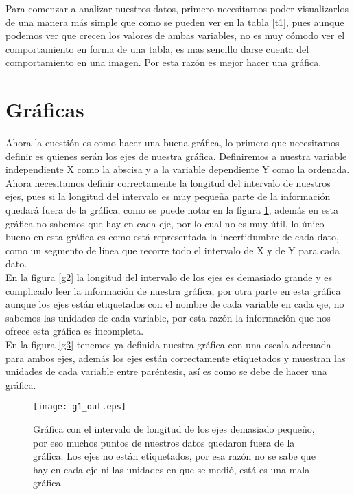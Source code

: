 \documentclass[12pt,letterpaper]{report}
\begin{document}
Para comenzar a analizar nuestros datos, primero necesitamos poder visualizarlos de una manera más simple que como se pueden ver en la tabla \ref{t1}, pues aunque podemos ver que crecen los valores de ambas variables, no es muy cómodo ver el comportamiento en forma de una tabla, es mas sencillo darse cuenta del comportamiento en una imagen. Por esta razón es mejor hacer una gráfica.\\

\section{Gráficas}

Ahora la cuestión es como hacer una buena gráfica, lo primero que necesitamos definir es quienes serán los ejes de nuestra gráfica. Definiremos a nuestra variable independiente X como la abscisa y a la variable dependiente  Y como la ordenada. Ahora necesitamos definir correctamente  la longitud del intervalo de nuestros ejes, pues si la longitud del intervalo es muy pequeña parte de la información quedará fuera de la gráfica, como se puede notar en la figura \ref{g1}, además en esta gráfica no sabemos que hay en cada eje, por lo cual no es muy útil, lo único bueno en esta gráfica es como está representada la incertidumbre de cada dato, como un segmento de línea que recorre todo el intervalo de X y de Y para cada dato.\\

En la  figura \ref{g2} la longitud del intervalo de los ejes es demasiado grande y  es complicado leer la información de nuestra gráfica, por otra parte en esta gráfica aunque los ejes están etiquetados con el nombre de cada variable en cada eje, no sabemos las unidades de cada variable, por esta razón la información que nos ofrece esta gráfica es incompleta.\\ 

En la figura \ref{g3} tenemos ya definida nuestra gráfica con una escala adecuada para ambos ejes, además los ejes están correctamente etiquetados y muestran las unidades de cada variable entre paréntesis, así es como se debe de hacer una gráfica.\\

\begin{figure}
\begin{center}
\texttt{[image: g1\_out.eps]} 
\caption{Gráfica con el intervalo de longitud de los ejes demasiado pequeño, por eso muchos puntos de nuestros datos quedaron fuera de la gráfica. Los ejes no están  etiquetados, por esa razón no se sabe que hay en cada eje ni las unidades en que se medió, está es una mala gráfica.}\label{g1}
\end{center}
\end{figure}
\end{document}
